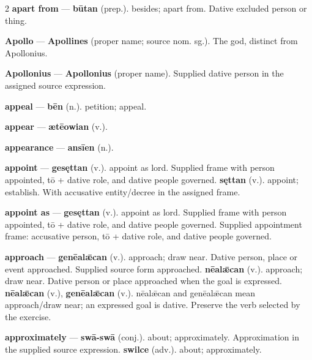 \begin{multicols}{2}
\textbf{apart from} — \textbf{būtan} (prep.). besides; apart from. Dative excluded person or thing.\par
\textbf{Apollo} — \textbf{Apollines} (proper name; source nom. sg.). The god, distinct from Apollonius.\par
\textbf{Apollonius} — \textbf{Apollonius} (proper name). Supplied dative person in the assigned source expression.\par
\textbf{appeal} — \textbf{bēn} (n.). petition; appeal.\par
\textbf{appear} — \textbf{ætēowian} (v.).\par
\textbf{appearance} — \textbf{ansīen} (n.).\par
\textbf{appoint} — \textbf{gesęttan} (v.). appoint as lord. Supplied frame with person appointed, tō + dative role, and dative people governed. \textbf{sęttan} (v.). appoint; establish. With accusative entity/decree in the assigned frame.\par
\textbf{appoint as} — \textbf{gesęttan} (v.). appoint as lord. Supplied frame with person appointed, tō + dative role, and dative people governed. Supplied appointment frame: accusative person, tō + dative role, and dative people governed.\par
\textbf{approach} — \textbf{genēalǣcan} (v.). approach; draw near. Dative person, place or event approached. Supplied source form approached. \textbf{nēalǣcan} (v.). approach; draw near. Dative person or place approached when the goal is expressed. \textbf{nēalǣcan} (v.), \textbf{genēalǣcan} (v.). nēalǣcan and genēalǣcan mean approach/draw near; an expressed goal is dative. Preserve the verb selected by the exercise.\par
\textbf{approximately} — \textbf{swā-swā} (conj.). about; approximately. Approximation in the supplied source expression. \textbf{swilce} (adv.). about; approximately.\par

\end{multicols}
